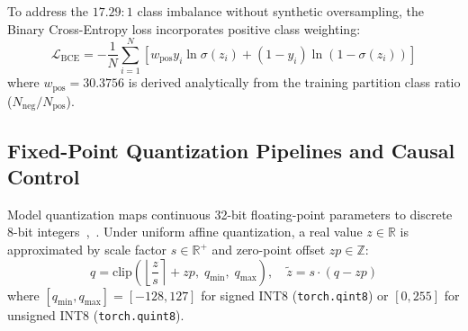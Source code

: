 \documentclass[conference]{IEEEtran}
\begin{document}
To address the $17.29:1$ class imbalance without synthetic oversampling, the Binary Cross-Entropy loss incorporates positive class weighting:
\begin{equation}
\mathcal{L}_{\text{BCE}} = -\frac{1}{N} \sum_{i=1}^N \left[ w_{\text{pos}} y_i \ln \sigma(z_i) + (1 - y_i) \ln(1 - \sigma(z_i)) \right]
\label{eq:bce_weighted}
\end{equation}
where $w_{\text{pos}} = 30.3756$ is derived analytically from the training partition class ratio ($N_{\text{neg}} / N_{\text{pos}}$).

\subsection{Fixed-Point Quantization Pipelines and Causal Control}
\label{sec:quantization}
Model quantization maps continuous 32-bit floating-point parameters to discrete 8-bit integers~\cite{b5},~\cite{b20}. Under uniform affine quantization, a real value $z \in \mathbb{R}$ is approximated by scale factor $s \in \mathbb{R}^+$ and zero-point offset $zp \in \mathbb{Z}$:
\begin{equation}
q = \text{clip}\left(\left\lfloor \frac{z}{s} \right\rceil + zp, \; q_{\min}, \; q_{\max}\right), \quad \tilde{z} = s \cdot (q - zp)
\label{eq:quant_affine}
\end{equation}
where $[q_{\min}, q_{\max}] = [-128, 127]$ for signed INT8 (\texttt{torch.qint8}) or $[0, 255]$ for unsigned INT8 (\texttt{torch.quint8}).
\end{document}
